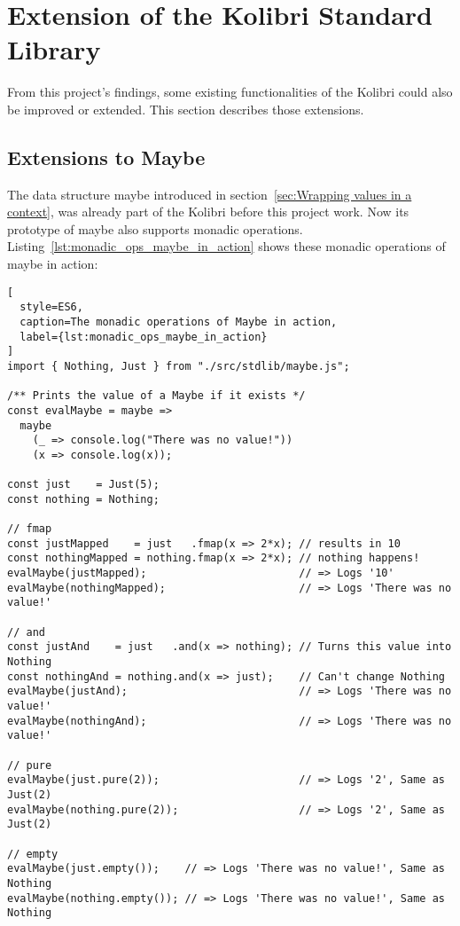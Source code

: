 \section{Extension of the Kolibri Standard Library}
\label{sec:Extension of the Kolibri Standard Library}
From this project's findings, some existing functionalities of the Kolibri
could also be improved or extended. This section describes those extensions.

\subsection{Extensions to Maybe} %
\label{sub:Extensions to Maybe}
The data structure maybe introduced in section~\ref{sec:Wrapping values in a
context}, was already part of the Kolibri before this project work. Now its
prototype of maybe also supports monadic operations.\\
Listing~\ref{lst:monadic_ops_maybe_in_action} shows these monadic operations of
maybe in action:

\begin{lstlisting}[
  style=ES6,
  caption=The monadic operations of Maybe in action,
  label={lst:monadic_ops_maybe_in_action}
]
import { Nothing, Just } from "./src/stdlib/maybe.js";

/** Prints the value of a Maybe if it exists */
const evalMaybe = maybe =>
  maybe
    (_ => console.log("There was no value!"))
    (x => console.log(x));

const just    = Just(5);
const nothing = Nothing;

// fmap 
const justMapped    = just   .fmap(x => 2*x); // results in 10
const nothingMapped = nothing.fmap(x => 2*x); // nothing happens!
evalMaybe(justMapped);                        // => Logs '10'
evalMaybe(nothingMapped);                     // => Logs 'There was no value!' 

// and
const justAnd    = just   .and(x => nothing); // Turns this value into Nothing
const nothingAnd = nothing.and(x => just);    // Can't change Nothing
evalMaybe(justAnd);                           // => Logs 'There was no value!'
evalMaybe(nothingAnd);                        // => Logs 'There was no value!' 

// pure
evalMaybe(just.pure(2));                      // => Logs '2', Same as Just(2)
evalMaybe(nothing.pure(2));                   // => Logs '2', Same as Just(2)

// empty
evalMaybe(just.empty());    // => Logs 'There was no value!', Same as Nothing
evalMaybe(nothing.empty()); // => Logs 'There was no value!', Same as Nothing
\end{lstlisting}

